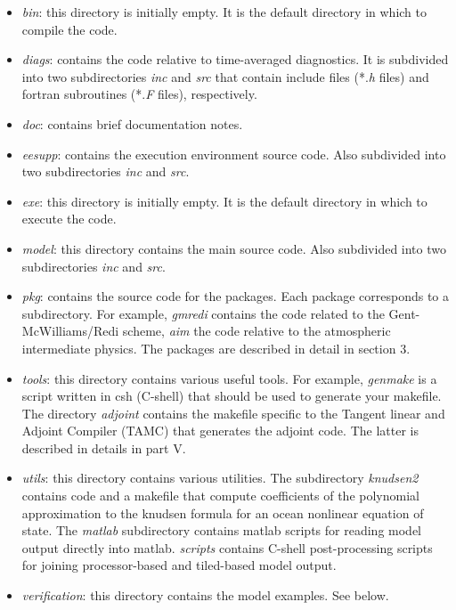 \begin{itemize}
\item \textit{bin}: this directory is initially empty. It is the default
directory in which to compile the code.

\item \textit{diags}: contains the code relative to time-averaged
diagnostics. It is subdivided into two subdirectories \textit{inc} and 
\textit{src} that contain include files (*.\textit{h} files) and fortran
subroutines (*.\textit{F} files), respectively.

\item \textit{doc}: contains brief documentation notes.

\item \textit{eesupp}: contains the execution environment source code. Also
subdivided into two subdirectories \textit{inc} and \textit{src}.

\item \textit{exe}: this directory is initially empty. It is the default
directory in which to execute the code.

\item \textit{model}: this directory contains the main source code. Also
subdivided into two subdirectories \textit{inc} and \textit{src}.

\item \textit{pkg}: contains the source code for the packages. Each package
corresponds to a subdirectory. For example, \textit{gmredi} contains the
code related to the Gent-McWilliams/Redi scheme, \textit{aim} the code
relative to the atmospheric intermediate physics. The packages are described
in detail in section 3.

\item \textit{tools}: this directory contains various useful tools. For
example, \textit{genmake} is a script written in csh (C-shell) that should
be used to generate your makefile. The directory \textit{adjoint} contains
the makefile specific to the Tangent linear and Adjoint Compiler (TAMC) that
generates the adjoint code. The latter is described in details in part V.

\item \textit{utils}: this directory contains various utilities. The
subdirectory \textit{knudsen2} contains code and a makefile that compute
coefficients of the polynomial approximation to the knudsen formula for an
ocean nonlinear equation of state. The \textit{matlab} subdirectory contains
matlab scripts for reading model output directly into matlab. \textit{scripts%
} contains C-shell post-processing scripts for joining processor-based and
tiled-based model output.

\item \textit{verification}: this directory contains the model examples. See
below.
\end{itemize}

